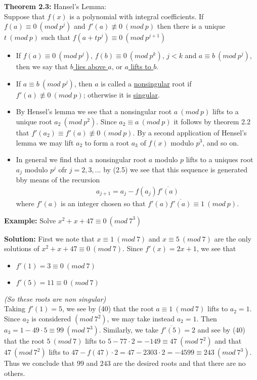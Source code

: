 \documentclass[a4paper]{article}
\begin{document}
\textbf{Theorem 2.3:} Hansel's Lemma:\\
Suppose that $f(x)$ is a polynomial with integral coefficients.
If $f(a)\equiv0\ (mod\ p^j)$ and $f'(a)\not\equiv0\ (mod\ p)$ then there is
a unique $t\ (mod\ p)$ such that $f(a+tp^j)\equiv0\ (mod\ p^{j+1})$

\begin{itemize}
    \item If $f(a)\equiv0\ (mod\ p^j)$, $f(b)\equiv 0\ (mod\ p^k)$, $j<k$ and
    $a\equiv b\ (mod\ p^j)$, then we say that \underline{$b$ lies above $a$}, or
    \underline{$a$ lifts to $b$}.
    \item If $a\equiv b\ (mod\ p^j)$, then $a$ is called a \underline{nonsingular}
    root if $f'(a)\not\equiv 0\ (mod\ p)$; otherwise it is \underline{singular}.
    \item By Hensel's lemma we see that a nonsingular root $a\ (mod\ p)$ lifts
    to a unique root $a_2\ (mod\ p^2)$. Since $a_2\equiv a\ (mod\ p)$ it follows
    by theorem 2.2 that $f'(a_2)\equiv f'(a)\not\equiv 0\ (mod\ p)$. By a second
    application of Hensel's lemma we may lift $a_2$ to form a root $a_3$ of $f(x)$
    modulo $p^3$, and so on.
    \item In general we find that a nonsingular root $a$ modulo $p$ lifts to a
    uniques root $a_j$ modulo $p^j$ ofr $j=2,3,...$ by (2.5) we see that this
    sequence is generated bby means of the recursion
    \begin{align}
        a_{j+1} = a_j-f(a_j)\overline{f'(a)}
    \end{align}
    where $f'(a)$ is an integer chosen so that
    $f'(a)\overline{f'(a)}\equiv 1\ (mod\ p)$.
\end{itemize}

\textbf{Example:}
Solve $x^2+x+47\equiv 0\ (mod\ 7^3)$

\textbf{Solution:}
First we note that $x\equiv 1\ (mod\ 7)$ and $x\equiv 5\ (mod\ 7)$ are the only
solutions of $x^2+x+47\equiv 0\ (mod\ 7)$. Since $f'(x)=2x+1$, we see that
\begin{itemize}
    \item $f'(1)=3\equiv 0\ (mod\ 7)$
    \item $f'(5)=11\equiv 0\ (mod\ 7)$
\end{itemize}
\textit{(So these roots are non singular)}\\
Taking $f'(1)=5$, we see by (40) that the root $a\equiv 1\ (mod\ 7)$ lifts to
$a_2=1$. Since $a_2$ is considered $(mod\ 7^2)$, we may take instead $a_2=1$.
Then $a_3=1-49\cdot5\equiv 99\ (mod\ 7^3)$. Similarly, we take $\overline{f'(5)}=2$
and see by (40) that the root $5\ (mod\ 7)$ lifts to
$5-77\cdot2=-149\equiv 47\ (mod\ 7^2)$ and that $47\ (mod\ 7^2)$ lifts to
$47-f(47)\cdot2=47-2303\cdot2=-4599\equiv 243\ (mod\ 7^3)$.
Thus we conclude that $99$ and $243$ are the desired roots and that there are
no others.
\end{document}

